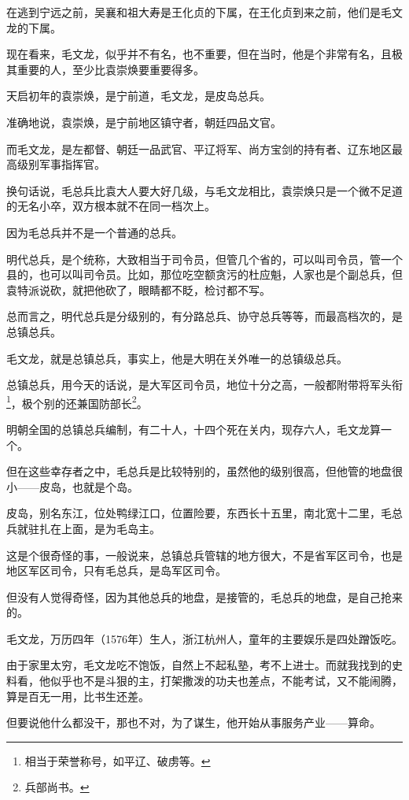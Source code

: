 \begin{multicols}{\theparacolNo}
		在逃到宁远之前，吴襄和祖大寿是王化贞的下属，在王化贞到来之前，他们是毛文龙的下属。

		现在看来，毛文龙，似乎并不有名，也不重要，但在当时，他是个非常有名，且极其重要的人，至少比袁崇焕要重要得多。

		天启初年的袁崇焕，是宁前道，毛文龙，是皮岛总兵。

		准确地说，袁崇焕，是宁前地区镇守者，朝廷四品文官。

		而毛文龙，是左都督、朝廷一品武官、平辽将军、尚方宝剑的持有者、辽东地区最高级别军事指挥官。

		换句话说，毛总兵比袁大人要大好几级，与毛文龙相比，袁崇焕只是一个微不足道的无名小卒，双方根本就不在同一档次上。

		因为毛总兵并不是一个普通的总兵。

		明代总兵，是个统称，大致相当于司令员，但管几个省的，可以叫司令员，管一个县的，也可以叫司令员。比如，那位吃空额贪污的杜应魁，人家也是个副总兵，但袁特派说砍，就把他砍了，眼睛都不眨，检讨都不写。

		总而言之，明代总兵是分级别的，有分路总兵、协守总兵等等，而最高档次的，是总镇总兵。

		毛文龙，就是总镇总兵，事实上，他是大明在关外唯一的总镇级总兵。

		总镇总兵，用今天的话说，是大军区司令员，地位十分之高，一般都附带将军头衔\footnote{相当于荣誉称号，如平辽、破虏等。}，极个别的还兼国防部长\footnote{兵部尚书。}。

		明朝全国的总镇总兵编制，有二十人，十四个死在关内，现存六人，毛文龙算一个。

		但在这些幸存者之中，毛总兵是比较特别的，虽然他的级别很高，但他管的地盘很小——皮岛，也就是个岛。

		皮岛，别名东江，位处鸭绿江口，位置险要，东西长十五里，南北宽十二里，毛总兵就驻扎在上面，是为毛岛主。

		这是个很奇怪的事，一般说来，总镇总兵管辖的地方很大，不是省军区司令，也是地区军区司令，只有毛总兵，是岛军区司令。

		但没有人觉得奇怪，因为其他总兵的地盘，是接管的，毛总兵的地盘，是自己抢来的。

		毛文龙，万历四年（1576年）生人，浙江杭州人，童年的主要娱乐是四处蹭饭吃。

		由于家里太穷，毛文龙吃不饱饭，自然上不起私塾，考不上进士。而就我找到的史料看，他似乎也不是斗狠的主，打架撒泼的功夫也差点，不能考试，又不能闹腾，算是百无一用，比书生还差。

		但要说他什么都没干，那也不对，为了谋生，他开始从事服务产业——算命。


\end{multicols}
